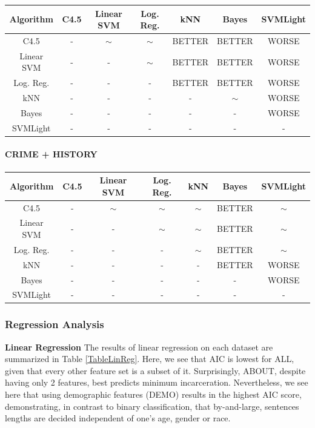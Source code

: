 \documentclass[11pt,letter]{article}
\begin{document}
\begin{tabular}{|c|c|c|c|c|c|c|}
\hline
Algorithm & C4.5  & Linear SVM & Log. Reg.  & kNN  & Bayes & SVMLight \\
\hline
C4.5 	& -		& $\sim$	& $\sim$	& BETTER	& BETTER	& WORSE		\\
Linear SVM		& -		& -			& $\sim$	& BETTER	& BETTER	& WORSE		\\
Log. Reg. 	& -		& -			& -			& BETTER	& BETTER	& WORSE 	\\
kNN 		& -		& -			& -			& -			& $\sim$	& WORSE		\\
Bayes			& -		& -			& -			& -			& -			& WORSE		\\
SVMLight & - & - & - & - & - & - \\
\hline
\end{tabular}

\paragraph{CRIME + HISTORY} \quad

\begin{tabular}{|c|c|c|c|c|c|c|}
\hline
Algorithm & C4.5  & Linear SVM & Log. Reg.  & kNN  & Bayes & SVMLight \\
\hline
C4.5 	& -		& $\sim$	& $\sim$	& $\sim$	& BETTER	& $\sim$		\\
Linear SVM		& -		& -			& $\sim$	& $\sim$	& BETTER	& $\sim$		\\
Log. Reg. 	& -		& -			& -			& $\sim$	& BETTER	& $\sim$ 	\\
kNN 		& -		& -			& -			& -			& BETTER	& WORSE		\\
Bayes			& -		& -			& -			& -			& -			& WORSE		\\
SVMLight & - & - & - & - & - & - \\
\hline
\end{tabular}


\subsubsection{Regression Analysis}

\textbf{Linear Regression}
The results of linear regression on each dataset are summarized in Table \ref{TableLinReg}. Here, we see that AIC is lowest for ALL, given that every other feature set is a subset of it. Surprisingly, ABOUT, despite having only 2 features, best predicts minimum incarceration. Nevertheless, we see here that using demographic features (DEMO) results in the highest AIC score, demonstrating, in contrast to binary classification, that by-and-large, sentences lengths are decided independent of one's age, gender or race.
\end{document}
